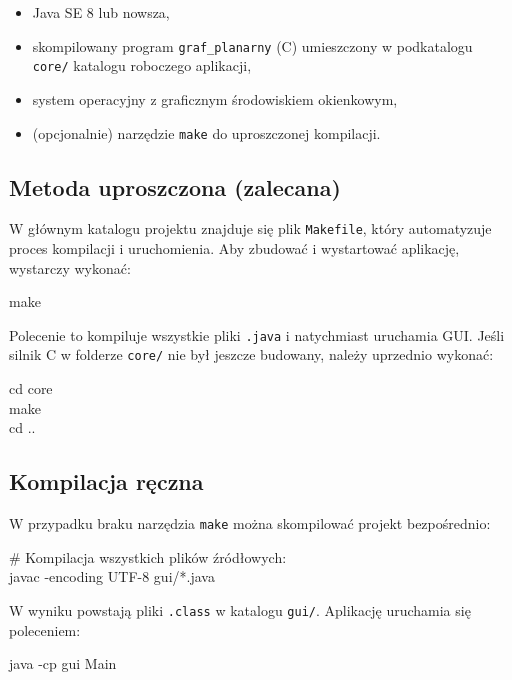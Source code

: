 \documentclass[a4paper, 11pt]{article}
\begin{document}
\begin{itemize}
  \item Java SE 8 lub nowsza,
  \item skompilowany program \texttt{graf\_planarny} (C) umieszczony
    w podkatalogu \texttt{core/} katalogu roboczego aplikacji,
  \item system operacyjny z graficznym środowiskiem okienkowym,
  \item (opcjonalnie) narzędzie \texttt{make} do uproszczonej kompilacji.
\end{itemize}

\subsection{Metoda uproszczona (zalecana)}

W głównym katalogu projektu znajduje się plik \texttt{Makefile},
który automatyzuje proces kompilacji i uruchomienia. Aby zbudować
i wystartować aplikację, wystarczy wykonać:

\begin{cmdbox}
make
\end{cmdbox}

Polecenie to kompiluje wszystkie pliki \texttt{.java} i natychmiast
uruchamia GUI. Jeśli silnik C w folderze \texttt{core/} nie był jeszcze
budowany, należy uprzednio wykonać:

\begin{cmdbox}
cd core\\
make\\
cd ..
\end{cmdbox}

\subsection{Kompilacja ręczna}

W przypadku braku narzędzia \texttt{make} można skompilować projekt
bezpośrednio:

\begin{cmdbox}
\# Kompilacja wszystkich plików źródłowych:\\
javac -encoding UTF-8 gui/*.java
\end{cmdbox}

W wyniku powstają pliki \texttt{.class} w katalogu \texttt{gui/}.
Aplikację uruchamia się poleceniem:

\begin{cmdbox}
java -cp gui Main
\end{cmdbox}
\end{document}
